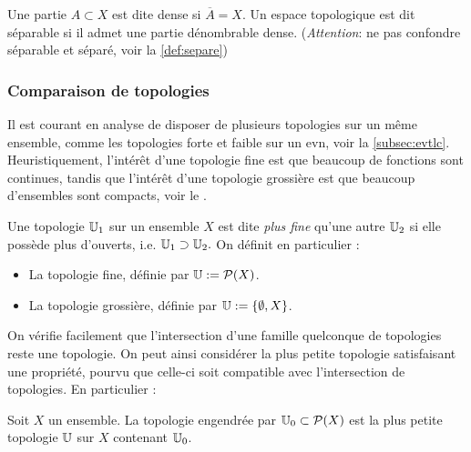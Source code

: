 \begin{definition}
\label{def:dense}
%
	Une partie $A \subset X$ est dite dense si $\overline A = X$.
	Un espace topologique est dit séparable si il admet une partie dénombrable dense.
	(\emph{Attention}: ne pas confondre séparable et séparé, voir la \cref{def:separe})
\end{definition}

\subsubsection{Comparaison de topologies}
\label{subsubsec:compTopo}


Il est courant en analyse de disposer de plusieurs topologies sur un même ensemble, comme les  topologies forte et faible sur un evn, voir la \cref{subsec:evtlc}. Heuristiquement, l'intérêt d'une topologie fine est que beaucoup de fonctions sont continues,
tandis que l'intérêt d'une topologie grossière est que beaucoup d'ensembles sont compacts, voir le .

\begin{definition}
\label{def:finesseTopo}
%
Une topologie $\mathbb{U}_1$ sur un ensemble $X$ est dite \emph{plus fine} qu'une autre $\mathbb{U}_2$ si elle possède plus d'ouverts, i.e. 
$
	\mathbb{U}_1 \supset \mathbb{U}_2. 
$
On définit en particulier :
\begin{itemize}
	\item La topologie fine, définie par $\mathbb{U} := \mathcal{P}(X)$.
	\item La topologie grossière, définie par $\mathbb{U} := \{\emptyset, X\}$. 
\end{itemize}	
\end{definition}

On vérifie facilement que l'intersection d'une famille quelconque de topologies reste une topologie. On peut ainsi considérer la plus petite topologie satisfaisant une propriété, pourvu que celle-ci soit compatible avec l'intersection de topologies. En particulier : 

\begin{definition}
\label{def:topoEngendree}
%
	Soit $X$ un ensemble. La topologie engendrée par $\mathbb{U}_0 \subset \mathcal{P}(X)$ est la plus petite topologie $\mathbb{U}$ sur $X$ contenant $\mathbb{U}_0$. 
\end{definition}

